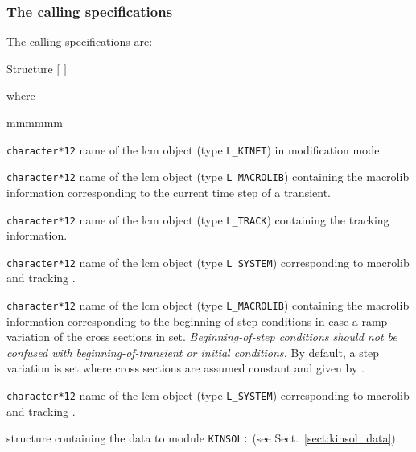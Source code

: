 \subsubsection{The calling specifications}

The calling specifications are:

\begin{DataStructure}{Structure }
 \moc{:=}      $[$   $]$
\moc{::} 
\end{DataStructure}

\noindent where
\begin{ListeDeDescription}{mmmmmm}

\item[\dusa{KINET}] {\tt character*12} name of the {\sc lcm} object (type {\tt L\_KINET}) in modification mode.

\item[\dusa{MACRO}] {\tt character*12} name of the {\sc lcm} object (type {\tt L\_MACROLIB}) containing the {\sc macrolib}
information corresponding to the current time step of a transient.

\item[\dusa{TRACK}] {\tt character*12} name of the {\sc lcm} object (type {\tt L\_TRACK}) containing the {\sc tracking} information.

\item[\dusa{SYST}] {\tt character*12} name of the {\sc lcm} object (type {\tt L\_SYSTEM}) corresponding to {\sc macrolib} 
and {\sc tracking} .

\item[\dusa{MACRO\_0}] {\tt character*12} name of the {\sc lcm} object (type {\tt L\_MACROLIB}) containing the {\sc macrolib}
information corresponding to the beginning-of-step conditions in case a ramp variation of the cross sections in set.
{\sl Beginning-of-step conditions should not be confused with beginning-of-transient or initial conditions.} By default,
a step variation is set where cross sections are assumed constant and given by .

\item[\dusa{SYST\_0}] {\tt character*12} name of the {\sc lcm} object (type {\tt L\_SYSTEM}) corresponding to {\sc macrolib} 
and {\sc tracking} .

\item[\dstr{kinsol\_data}] structure containing the data to module {\tt KINSOL:} (see Sect.~\ref{sect:kinsol_data}).

\end{ListeDeDescription}

